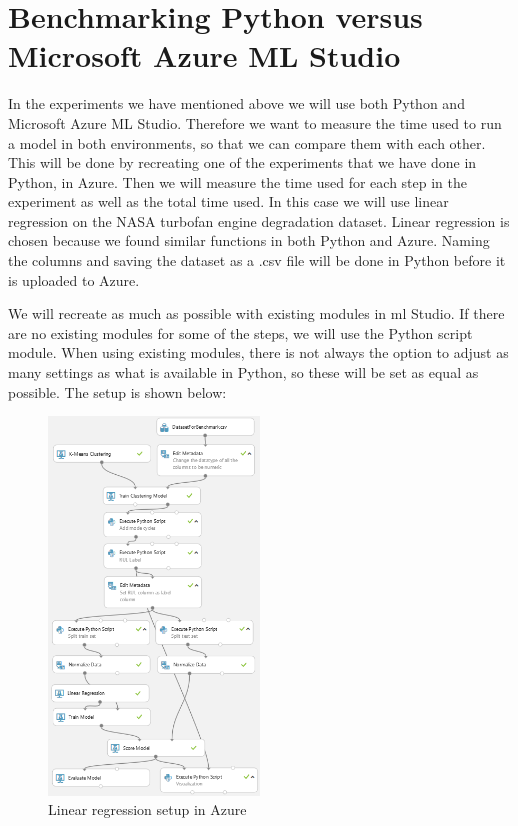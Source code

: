 \documentclass[english, a4paper]{report}
\begin{document}
{    \section{Benchmarking Python versus Microsoft Azure ML Studio} \label{benchmarking}
    {
        In the experiments we have mentioned above we will use both Python and Microsoft Azure ML Studio. Therefore we want to measure the time used to run a model in both environments, so that we can compare them with each other. This will be done by recreating one of the experiments that we have done in Python, in Azure. Then we will measure the time used for each step in the experiment as well as the total time used. In this case we will use linear regression on the NASA turbofan engine degradation dataset. Linear regression is chosen because we found similar functions in both Python and Azure. Naming the columns and saving the dataset as a .csv file will be done in Python before it is uploaded to Azure. 
        \par
        We will recreate as much as possible with existing modules in \gls{ml} Studio. If there are no existing modules for some of the steps, we will use the Python script module. When using existing modules, there is not always the option to adjust as many settings as what is available in Python, so these will be set as equal as possible. The setup is shown below:
        
        \begin{figure}[H]
            \centering
            \includegraphics[width=0.5\textwidth]{LinearRegression}
            \caption{Linear regression setup in Azure}
            \label{fig:azureLinReg}
        \end{figure}
        
}}
\end{document}
